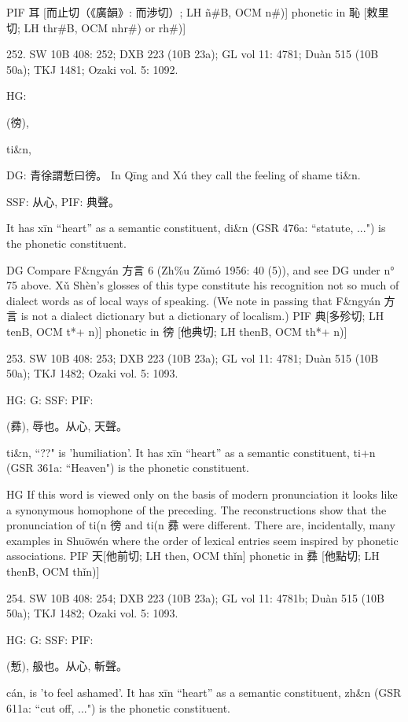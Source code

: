 PIF     耳 [而止切（《廣韻》: 而渉切）; LH ñ\#B, OCM n\#)] phonetic in 恥 [敕里切; LH thr\#B, OCM nhr\#) or rh\#)]



252. SW 10B 408: 252; DXB 223 (10B 23a); GL vol 11: 4781; Duàn 515 (10B 50a); TKJ 1481; Ozaki vol. 5: 1092.


HG:

(徬),

ti&n,

DG: 青徐謂慙曰徬。 In Qīng and Xú they call the feeling of shame ti&n.

SSF: 从心,
PIF: 典聲。

It has xīn ``heart'' as a semantic constituent,
di&n (GSR 476a: ``statute, ...") is the phonetic constituent.

DG Compare F&ngyán 方言 6 (Zh\%u Zǔmó 1956: 40 (5)), and see DG under n° 75 above. Xǔ Shèn's glosses of this type constitute his recognition not so much of dialect words as of local ways of speaking. (We note in passing that F&ngyán 方言 is not a dialect dictionary but a dictionary of localism.)
PIF  典[多殄切; LH tenB, OCM t*+ n)] phonetic in 徬 [他典切; LH thenB, OCM th*+ n)]

253. SW 10B 408: 253; DXB 223 (10B 23a); GL vol 11: 4781; Duàn 515 (10B 50a); TKJ 1482; Ozaki vol. 5: 1093.


HG:
G: SSF: PIF:

(彞),
辱也。从心, 天聲。

ti&n, ``??"
is 'humiliation'.
It has xīn ``heart'' as a semantic constituent,
ti+n (GSR 361a: ``Heaven") is the phonetic constituent.

HG If this word is viewed only on the basis of modern pronunciation it looks like a synonymous homophone of the preceding. The reconstructions show that the pronunciation of ti(n 徬 and ti(n 彞 were different. There are, incidentally, many examples in Shuōwén where the order of lexical entries seem inspired by phonetic associations.
PIF    天[他前切; LH then, OCM thǐn] phonetic in 彞 [他點切; LH thenB, OCM thǐn)]

254. SW 10B 408: 254; DXB 223 (10B 23a); GL vol 11: 4781b; Duàn 515 (10B 50a); TKJ 1482; Ozaki vol. 5: 1093.



HG:
G: SSF: PIF:

 (慙),
䑥也。从心, 斬聲。

cán,
is 'to feel ashamed'.
It has xīn ``heart'' as a semantic constituent,
zh&n (GSR 611a: ``cut off, ...") is the phonetic constituent.

